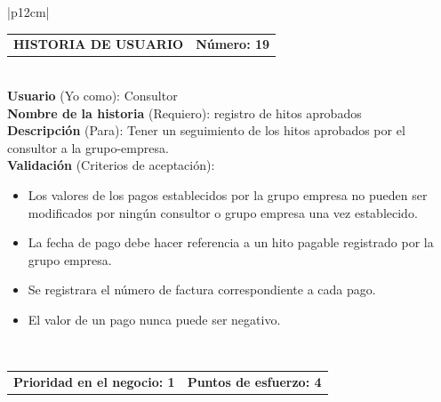 \documentclass[11pt,letterpaper]{report}
\begin{document}
	\begin{center}	
		\begin{tabular}{|p{12cm}|}
			\hline
			\begin{tabular}{c|c}
				\textbf{HISTORIA DE USUARIO} & \textbf{Número: 19} \\
			\end{tabular} \\ \hline
			\textbf{Usuario} (Yo como): Consultor \\ \hline
			\textbf{Nombre de la historia} (Requiero): registro de hitos aprobados \\ \hline
			\textbf{Descripción} (Para): Tener un seguimiento de los hitos aprobados por el consultor a la grupo-empresa. \\ \hline
			\textbf{Validación} (Criterios de aceptación): \\
			\begin{minipage}{12cm}
				\begin{itemize}
					\item Los valores de los pagos establecidos por la grupo empresa no pueden ser modificados por ningún consultor o grupo empresa una vez establecido.
					\item La fecha de pago debe hacer referencia a un hito pagable registrado por la grupo empresa.
					\item Se registrara el número de factura correspondiente a cada pago.
					\item El valor de un pago nunca puede ser negativo.
				\end{itemize}
			\end{minipage} \\ \hline
			\begin{tabular}{c|c}
				\textbf{Prioridad en el negocio: 1} & \textbf{Puntos de esfuerzo: 4} \\
			\end{tabular} \\ \hline
		\end{tabular}
	\end{center}
	
\end{document}
